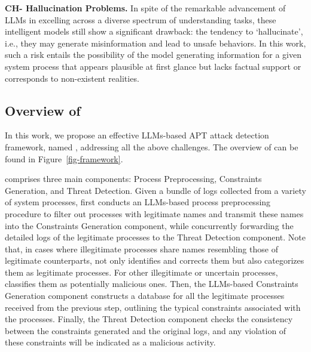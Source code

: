 \noindent
{\bf CH- Hallucination Problems.} %
In spite of the remarkable advancement of LLMs in excelling across a diverse spectrum of understanding tasks, these intelligent models still show a significant drawback: the tendency to `hallucinate', i.e., they may generate misinformation and lead to unsafe behaviors.
In this work, such a risk entails the possibility of the model generating information for a given system process that appears plausible at first glance but lacks factual support or corresponds to non-existent realities.


\subsection{Overview of \tool}
In this work, we propose an effective LLMs-based APT attack detection framework, named \tool, addressing all the above challenges. The overview of \tool can be found in Figure~\ref{fig-framework}.

\tool comprises three main components: Process Preprocessing, Constraints Generation, and Threat Detection.
Given a bundle of logs collected from a variety of system processes, \tool first conducts an LLMs-based process preprocessing procedure to filter out processes with legitimate names and transmit these names into the Constraints Generation component, while concurrently forwarding the detailed logs of the legitimate processes to the Threat Detection component. Note that, in cases where illegitimate processes share names resembling those of legitimate counterparts, \tool not only identifies and corrects them but also categorizes them as legitimate processes. For other illegitimate or uncertain processes, \tool classifies them as potentially malicious ones. Then, the LLMs-based Constraints Generation component constructs a database for all the legitimate processes received from the previous step, outlining the typical constraints associated with the processes. Finally, the Threat Detection component checks the consistency between the constraints generated and the original logs, and any violation of these constraints will be indicated as a malicious activity.


